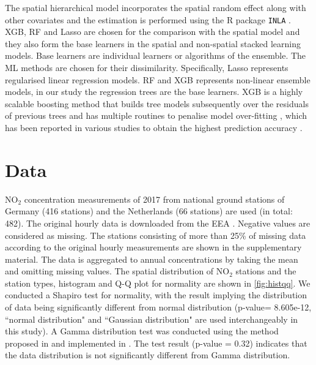 \documentclass{article}
\begin{document}
 
 
The spatial hierarchical model incorporates the spatial random effect along with other covariates and the estimation is performed using the R package \texttt{INLA} \citep{rue2009approximate,martins2013bayesian}. XGB, RF and Lasso are chosen for the comparison with the  spatial model and they also form the base learners in the  spatial and non-spatial stacked learning models. Base learners are individual learners or algorithms of the ensemble. The ML methods are chosen for their dissimilarity. Specifically, Lasso represents regularised linear regression models. RF and XGB represents non-linear ensemble models, in our study the regression trees are the base learners. XGB is a highly scalable boosting method that builds tree models subsequently over the residuals of previous trees and has multiple routines to penalise model over-fitting \citep{xgboost}, which has been reported in various studies to obtain the highest prediction accuracy \citep{luglobal}. 

 
\section{Data}
NO$_2$ concentration measurements of 2017 from national ground stations of Germany (416 stations) and the Netherlands (66 stations) are used (in total: 482). The original hourly data is downloaded from the EEA \citep[European Environment Agency,][]{nelson1999european,EEA}. Negative values are considered as missing. The stations consisting of  more than 25\% of missing data according to the original hourly measurements are shown in the supplementary material.  The data is aggregated to annual concentrations by taking the mean and omitting missing values. The spatial distribution of NO$_2$ stations and the station types, histogram and Q-Q plot for normality are shown in \cref{fig:histqq}. %
We conducted a Shapiro test for normality, with the result implying the distribution of data being significantly different from normal distribution (p-value= 8.605e-12, ``normal distribution" and ``Gaussian distribution" are used interchangeably in this study).
A Gamma distribution test was conducted using the method proposed in \cite{villasenor2015variance} and implemented in \cite{goft}.  The test result (p-value = 0.32) indicates that the data distribution is not significantly different from Gamma distribution.
\end{document}
